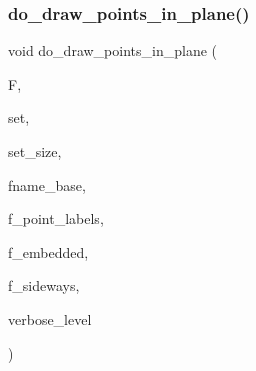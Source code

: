 \subsubsection{\texorpdfstring{do\+\_\+draw\+\_\+points\+\_\+in\+\_\+plane()}{do\_draw\_points\_in\_plane()}}
{\footnotesize\ttfamily void do\+\_\+draw\+\_\+points\+\_\+in\+\_\+plane (\begin{DoxyParamCaption}\item[{\mbox{\hyperlink{classfinite__field}{finite\+\_\+field}} $\ast$}]{F,  }\item[{\mbox{\hyperlink{galois_8h_a09fddde158a3a20bd2dcadb609de11dc}{I\+NT}} $\ast$}]{set,  }\item[{\mbox{\hyperlink{galois_8h_a09fddde158a3a20bd2dcadb609de11dc}{I\+NT}}}]{set\+\_\+size,  }\item[{const \mbox{\hyperlink{galois_8h_ab6cc7b4aeb6ea31aba2b3fbfc83ff5e6}{B\+Y\+TE}} $\ast$}]{fname\+\_\+base,  }\item[{\mbox{\hyperlink{galois_8h_a09fddde158a3a20bd2dcadb609de11dc}{I\+NT}}}]{f\+\_\+point\+\_\+labels,  }\item[{\mbox{\hyperlink{galois_8h_a09fddde158a3a20bd2dcadb609de11dc}{I\+NT}}}]{f\+\_\+embedded,  }\item[{\mbox{\hyperlink{galois_8h_a09fddde158a3a20bd2dcadb609de11dc}{I\+NT}}}]{f\+\_\+sideways,  }\item[{\mbox{\hyperlink{galois_8h_a09fddde158a3a20bd2dcadb609de11dc}{I\+NT}}}]{verbose\+\_\+level }\end{DoxyParamCaption})}

\mbox{\label{geometric__operations_8_c_a7b472fe7f4332da48b2e47e2370cf338}} 
